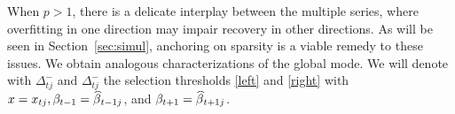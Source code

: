 \documentclass[ba]{imsart}
\numberwithin{equation}{section}
\theoremstyle{plain}
\def\y{\mbox{\boldmath$y$}}
\def\b{\mbox{\boldmath$b$}}
\newcommand{\bm}[1]{\boldsymbol{#1}}
\newcommand{\wh}[1]{\smash{\widehat{#1}}}
\def\y{\bm{y}}
\def\b{\bm{\beta}}
\begin{document}


When $p>1$, there is a delicate interplay between the multiple series, where overfitting in one direction may impair recovery in other directions.
As will be seen in Section~\ref{sec:simul}, anchoring on sparsity is a viable remedy to these issues. We obtain analogous characterizations of the global mode.
We will denote with $\Delta_{tj}^-$ and $\Delta_{tj}^-$ the selection thresholds \eqref{left} and \eqref{right} with $x=x_{tj},\beta_{t-1}=\wh{\beta}_{t-1j}$, and
$\beta_{t+1}=\wh{\beta}_{t+1j}$.
\end{document}
